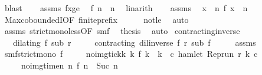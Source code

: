 \begin{isabellebody}
\ blast\isanewline
\ \ \isamarkupfalse%
\ assms{\isacharparenleft}{}{\isacharparenright}\ fxge\ \isamarkupfalse%
\ {\isacartoucheopen}f\ n\ {\isacharless}\ n{\isacartoucheclose}\ \isamarkupfalse%
\ linarith\isanewline
\ \ \isamarkupfalse%
\ assms{\isacharparenleft}{}{\isacharparenright}\ \isamarkupfalse%
\ {\isacartoucheopen}{\isasymforall}x\ {\isachargreater}\ n\ f\ x\ {\isachargreater}\ n{\isacartoucheclose}\ \isamarkupfalse%
\ Max{\isachardot}coboundedI{\isacharbrackleft}OF\ finite{\isacharunderscore}prefix{\isacharbrackright}\isanewline
\ \ \ \ \isamarkupfalse%
\ not{\isacharunderscore}le\ \isamarkupfalse%
\ auto\isanewline
\ \ \isamarkupfalse%
\ assms{\isacharparenleft}{}{\isacharparenright}\ strict{\isacharunderscore}mono{\isacharunderscore}less{\isacharbrackleft}OF\ smf{\isacharbrackright}\ \isamarkupfalse%
\ {\isacharquery}thesis\ \isamarkupfalse%
\ auto\isanewline
{}\isamarkupfalse%
%
\endisatagproof
{\isafoldproof}%
%
\isadelimproof
\isanewline
%
\endisadelimproof
\isanewline
{}\isamarkupfalse%
\ contracting{\isacharunderscore}inverse{\isacharcolon}\isanewline
\ \ \ {\isacartoucheopen}dilating\ f\ sub\ r{\isacartoucheclose}\isanewline
\ \ \ \ \ {\isacartoucheopen}contracting\ {\isacharparenleft}dil{\isacharunderscore}inverse\ f{\isacharparenright}\ r\ sub\ f{\isacartoucheclose}\isanewline
%
\isadelimproof
%
\endisadelimproof
%
\isatagproof
{}\isamarkupfalse%
\ {\isacharminus}\isanewline
\ \ \isamarkupfalse%
\ assms\ \isamarkupfalse%
\ smf{\isacharcolon}{\isacartoucheopen}strict{\isacharunderscore}mono\ f{\isacartoucheclose}\isanewline
\ \ \ \ \ no{\isacharunderscore}img{\isacharunderscore}tick{\isacharcolon}{\isacartoucheopen}{\isasymforall}k{\isachardot}\ {\isacharparenleft}{\isasymnexists}k\ f\ k\ {\isacharequal}\ k{\isacharparenright}\ {\isasymlongrightarrow}\ {\isacharparenleft}{\isasymforall}c{\isachardot}\ {\isasymnot}{\isacharparenleft}hamlet\ {\isacharparenleft}{\isacharparenleft}Rep{\isacharunderscore}run\ r{\isacharparenright}\ k\ c{\isacharparenright}{\isacharparenright}{\isacharparenright}{\isacartoucheclose}\isanewline
\ \ \ \ \ no{\isacharunderscore}img{\isacharunderscore}time{\isacharcolon}{\isacartoucheopen}{\isasymAnd}n{\isachardot}\ {\isacharparenleft}{\isasymnexists}n\ f\ n\ {\isacharequal}\ {\isacharparenleft}Suc\ n{\isacharparenright}{\isacharparenright}\isanewline

\end{isabellebody}
